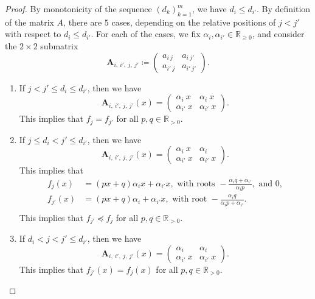 \documentclass[10pt,a4paper]{amsart}
\def\R{\mathbb{R}}
\begin{document}
\begin{proof}
    By monotonicity of the sequence $(d_k)_{k=1}^{m}$, we have $d_i \leqslant d_{i'}$. 
    By definition of the matrix $A$, there are $5$ cases, depending on the relative positions of $j < j'$ with respect to $d_i \leqslant d_{i'}$. For each of the cases, we fix $\alpha_{i}, \alpha_{i'} \in \R_{\geqslant 0}$, and consider the $2 \times 2$ submatrix 
    \[
    \mathbf{A}_{i, \:i',\: j,\:j'} \coloneqq 
    \begin{pmatrix}
        a_{i\: j} & a_{i \: j'} \\
        a_{i' \: j} & a_{i' \: j'}
    \end{pmatrix}. 
    \]
    \begin{enumerate}[\normalfont(i), leftmargin=18pt]
        \item If $j < j' \leqslant d_i \leqslant d_{i'}$, then we have 
        \[
        \mathbf{A}_{i, \:i',\: j,\:j'}(x) = 
        \begin{pmatrix}
        \alpha_i \: x & \alpha_i \: x  \\
        \alpha_{i'} \: x & \alpha_{i'} \: x
        \end{pmatrix}.
        \]
        This implies that $f_{j} = f_{j'}$ for all $p, q \in \R_{> 0}$. 
        \item If $j \leqslant  d_i < j' \leqslant d_{i'}$, then we have 
        \[
        \mathbf{A}_{i, \:i',\: j,\:j'}(x) = 
        \begin{pmatrix}
        \alpha_i \: x & \alpha_i  \\
        \alpha_{i'} \: x & \alpha_{i'} \: x
        \end{pmatrix}.
        \]
        This implies that 
        \begin{align*}
            f_{j}(x) &= (px + q) \alpha_ix + \alpha_{i'} x, \text{ with roots } - \frac{\alpha_{i}q + \alpha_{i'}}{\alpha_{i}p}, \text{ and }0,\\
            f_{j'}(x) &= (px + q) \alpha_i + \alpha_{i'} x, \text{ with root } - \frac{\alpha_{i} q}{\alpha_{i}p + \alpha_{i'}}.\\
        \end{align*}
        This implies that $f_{j'} \preceq f_{j}$ for all $p, q \in \R_{> 0}$. 

        \item If $d_{i} < j < j' \leqslant d_{i'}$, then we have
        \[
        \mathbf{A}_{i, \:i',\: j,\:j'}(x) = 
        \begin{pmatrix}
        \alpha_i  & \alpha_i  \\
        \alpha_{i'} \: x & \alpha_{i'} \: x
        \end{pmatrix}.
        \]
        This implies that $f_{j'}(x) = f_{j}(x)$ for all $p, q \in \R_{> 0}$. 


\end{enumerate}
\end{proof}
\end{document}
